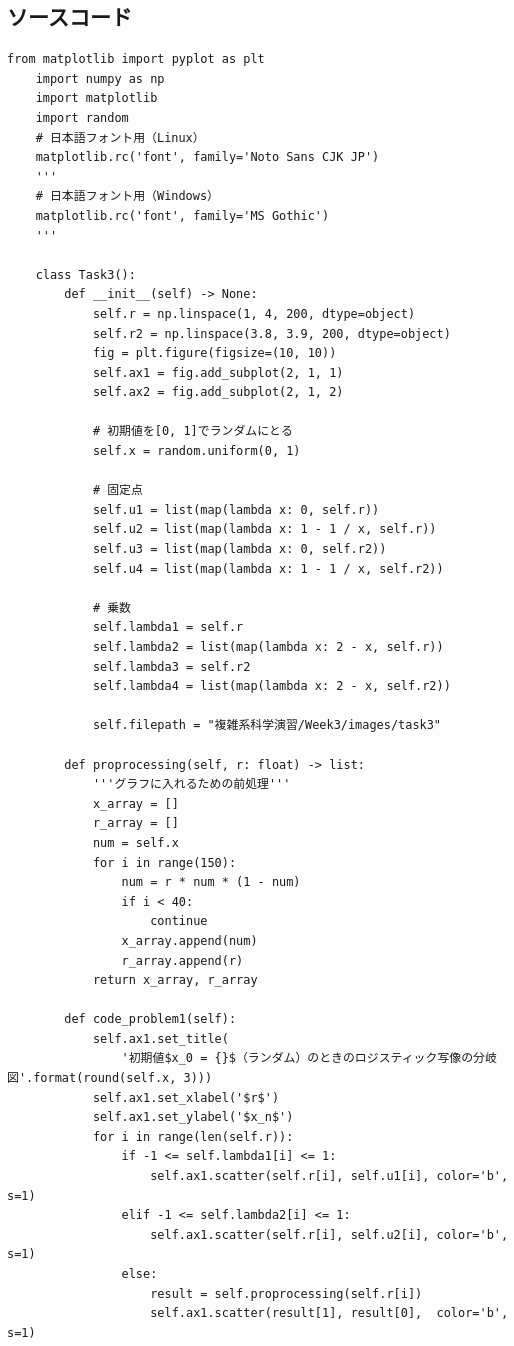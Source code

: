 \subsection{ソースコード}
\begin{lstlisting}[caption=week3.py]
    from matplotlib import pyplot as plt
    import numpy as np
    import matplotlib
    import random
    # 日本語フォント用（Linux）
    matplotlib.rc('font', family='Noto Sans CJK JP')
    '''
    # 日本語フォント用（Windows）
    matplotlib.rc('font', family='MS Gothic')
    '''
    
    class Task3():
        def __init__(self) -> None:
            self.r = np.linspace(1, 4, 200, dtype=object)
            self.r2 = np.linspace(3.8, 3.9, 200, dtype=object)
            fig = plt.figure(figsize=(10, 10))
            self.ax1 = fig.add_subplot(2, 1, 1)
            self.ax2 = fig.add_subplot(2, 1, 2)
    
            # 初期値を[0, 1]でランダムにとる
            self.x = random.uniform(0, 1)
    
            # 固定点
            self.u1 = list(map(lambda x: 0, self.r))
            self.u2 = list(map(lambda x: 1 - 1 / x, self.r))
            self.u3 = list(map(lambda x: 0, self.r2))
            self.u4 = list(map(lambda x: 1 - 1 / x, self.r2))
    
            # 乗数
            self.lambda1 = self.r
            self.lambda2 = list(map(lambda x: 2 - x, self.r))
            self.lambda3 = self.r2
            self.lambda4 = list(map(lambda x: 2 - x, self.r2))
    
            self.filepath = "複雑系科学演習/Week3/images/task3"
    
        def proprocessing(self, r: float) -> list:
            '''グラフに入れるための前処理'''
            x_array = []
            r_array = []
            num = self.x
            for i in range(150):
                num = r * num * (1 - num)
                if i < 40:
                    continue
                x_array.append(num)
                r_array.append(r)
            return x_array, r_array
    
        def code_problem1(self):
            self.ax1.set_title(
                '初期値$x_0 = {}$（ランダム）のときのロジスティック写像の分岐図'.format(round(self.x, 3)))
            self.ax1.set_xlabel('$r$')
            self.ax1.set_ylabel('$x_n$')
            for i in range(len(self.r)):
                if -1 <= self.lambda1[i] <= 1:
                    self.ax1.scatter(self.r[i], self.u1[i], color='b', s=1)
                elif -1 <= self.lambda2[i] <= 1:
                    self.ax1.scatter(self.r[i], self.u2[i], color='b', s=1)
                else:
                    result = self.proprocessing(self.r[i])
                    self.ax1.scatter(result[1], result[0],  color='b', s=1)
    

\end{lstlisting}
